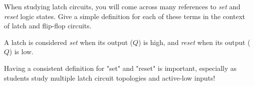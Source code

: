 

When studying latch circuits, you will come across many references to {\it set} and {\it reset} logic states.  Give a simple definition for each of these terms in the context of latch and flip-flop circuits.







A latch is considered {\it set} when its output ($Q$) is high, and {\it reset} when its output ($Q$) is low.







Having a consistent definition for "set" and "reset" is important, especially as students study multiple latch circuit topologies and active-low inputs!




